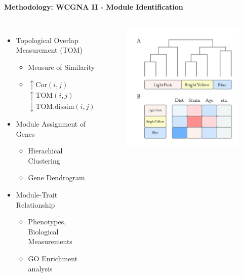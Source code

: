 \documentclass[
11pt,notheorems,hyperref={pdfauthor=whatever}
]{beamer}
\begin{document}
\begin{frame}
    \framesubtitle{Methodology: WCGNA II - Module Identification}
    \begin{columns}[T,onlytextwidth]
            \begin{itemize}
                \item Topological Overlap Measurement (TOM)
                \begin{itemize}
                    \item Measure of Similarity
                    \item $\uparrow \text{Cor}(i,j)$ $\uparrow \text{TOM}(i,j)$ $\downarrow \text{TOM.dissim}(i,j)$
                \end{itemize}
                \item Module Assignment of Genes
                \begin{itemize}
                    \item Hierachical Clustering
                    \item Gene Dendrogram
                \end{itemize}
                \item Module-Trait Relationship
                \begin{itemize}
                    \item Phenotypes, Biological Measurements
                    \item GO Enrichment analysis
                \end{itemize}
            \end{itemize}
        \vspace{-35px}
        \begin{figure}[h]
            \renewcommand{\figurename}{Figure 6}
            \includegraphics [scale=0.75] {AldoFruc_Module.jpg} 

\end{figure}
\end{columns}
\end{frame}
\end{document}
